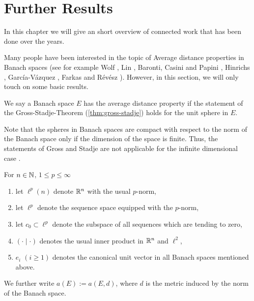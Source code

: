 \chapter{Further Results}\label{chap:further}

In this chapter we will give an short overview of connected work that has been done over the years.

Many people have been interested in the topic of Average distance properties in Banach spaces (see for example Wolf \cite{wolf:spheres,wolf:finite-real-banach,wolf:certain-banach,wolf:quasihypermetric-banach}, Lin \cite{lin}, Baronti, Casini and Papini \cite{baronti}, Hinrichs \cite{hinrichs:johns-ellipsoid,hinrichs:banach1,hinrichs:banach2}, García-Vázquez \cite{vazquez:l,vazquez:max-average}, Farkas and Révész \cite{farkas:potential-theory,}). However, in this section, we will only touch on some basic results.

\begin{definition}
	We say a Banach space $E$ has the average distance property if the statement of the Gross-Stadje-Theorem (\autoref{thm:gross-stadje}) holds for the unit sphere in $E$.
\end{definition}

Note that the spheres in Banach spaces are compact with respect to the norm of the Banach space only if the dimension of the space is finite. Thus, the statements of Gross \cite{gross} and Stadje \cite{stadje} are not applicable for the infinite dimensional case \cite[vgl.][]{wolf:spheres}.


\begin{notation}%
	For $n\in \mathbb{N}$, $1\leq p \leq \infty$
	\begin{enumerate}
		\item  let $\ell^p(n)$ denote $\mathbb{R}^n$ with the usual $p$-norm,
		\item let $\ell^p$ denote the sequence space equipped with the $p$-norm,
		\item let $c_0\subset \ell^p$ denote the subspace of all sequences which are tending to zero,
		\item $(\cdot\mid\cdot)$ denotes the usual inner product in $\mathbb{R}^n$ and $\ell^2$,
		\item $e_i$ $(i\geq 1)$ denotes the canonical unit vector in all Banach spaces mentioned above.
	\end{enumerate}
We further write $a(E):=a(E,d)$, where $d$ is the metric induced by the norm of the Banach space.
\end{notation}

